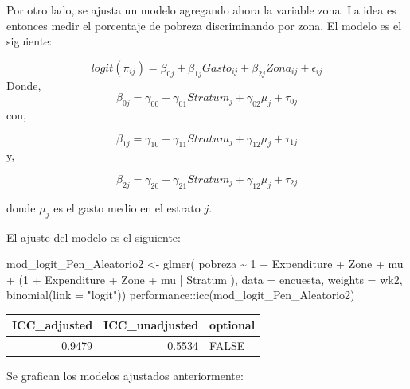 \documentclass[
  12pt,
]{book}
\newenvironment{Shaded}{\begin{snugshade}}{\end{snugshade}}
\newcommand{\AttributeTok}[1]{\textcolor[rgb]{0.77,0.63,0.00}{#1}}
\newcommand{\DecValTok}[1]{\textcolor[rgb]{0.00,0.00,0.81}{#1}}
\newcommand{\FunctionTok}[1]{\textcolor[rgb]{0.00,0.00,0.00}{#1}}
\newcommand{\NormalTok}[1]{#1}
\newcommand{\OtherTok}[1]{\textcolor[rgb]{0.56,0.35,0.01}{#1}}
\newcommand{\SpecialCharTok}[1]{\textcolor[rgb]{0.00,0.00,0.00}{#1}}
\newcommand{\StringTok}[1]{\textcolor[rgb]{0.31,0.60,0.02}{#1}}
\begin{document}
Por otro lado, se ajusta un modelo agregando ahora la variable zona. La idea es entonces medir el porcentaje de pobreza discriminando por zona. El modelo es el siguiente:

\[
logit(\pi_{ij})=\beta_{0j}+\beta_{1j}Gasto_{ij}+\beta_{2j}Zona_{ij} +\epsilon_{ij}
\]
Donde,
\[
\beta_{0j} = \gamma_{00}+\gamma_{01}Stratum_{j} + \gamma_{02}\mu_{j}  + \tau_{0j}
\]
con,

\[
\beta_{1j} = \gamma_{10}+\gamma_{11}Stratum_{j} + \gamma_{12}\mu_{j} + \tau_{1j}
\]
y,

\[
\beta_{2j} = \gamma_{20}+\gamma_{21}Stratum_{j} + \gamma_{12}\mu_{j} + \tau_{2j}
\]

donde \(\mu_{j}\) es el gasto medio en el estrato \(j\).

El ajuste del modelo es el siguiente:

\begin{Shaded}
\begin{Highlighting}[]
\NormalTok{mod\_logit\_Pen\_Aleatorio2 }\OtherTok{\textless{}{-}} \FunctionTok{glmer}\NormalTok{(}
\NormalTok{  pobreza }\SpecialCharTok{\textasciitilde{}} \DecValTok{1} \SpecialCharTok{+}\NormalTok{ Expenditure }\SpecialCharTok{+}\NormalTok{ Zone }\SpecialCharTok{+}\NormalTok{ mu }\SpecialCharTok{+}
\NormalTok{    (}\DecValTok{1} \SpecialCharTok{+}\NormalTok{ Expenditure }\SpecialCharTok{+}\NormalTok{ Zone }\SpecialCharTok{+}\NormalTok{ mu }\SpecialCharTok{|}\NormalTok{ Stratum ),}
    \AttributeTok{data =}\NormalTok{ encuesta, }\AttributeTok{weights  =}\NormalTok{  wk2, }
  \FunctionTok{binomial}\NormalTok{(}\AttributeTok{link =} \StringTok{"logit"}\NormalTok{))}
\NormalTok{performance}\SpecialCharTok{::}\FunctionTok{icc}\NormalTok{(mod\_logit\_Pen\_Aleatorio2)}
\end{Highlighting}
\end{Shaded}

\begin{tabular}{r|r|l}
\hline
ICC\_adjusted & ICC\_unadjusted & optional\\
\hline
0.9479 & 0.5534 & FALSE\\
\hline
\end{tabular}

Se grafican los modelos ajustados anteriormente:
\end{document}
